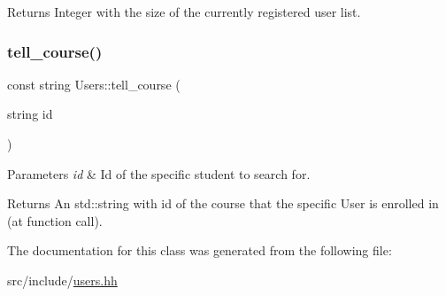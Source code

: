 \begin{DoxyReturn}{Returns}
Integer with the size of the currently registered user list. 
\end{DoxyReturn}
\mbox{\label{classUsers_ae684c15122bfac0f515a9c87307e0bbc}} 
\subsubsection{\texorpdfstring{tell\+\_\+course()}{tell\_course()}}
{\footnotesize\ttfamily const string Users\+::tell\+\_\+course (\begin{DoxyParamCaption}\item[{string}]{id }\end{DoxyParamCaption})}


\begin{DoxyParams}{Parameters}
{\em id} & Id of the specific student to search for. \\
\hline
\end{DoxyParams}
\begin{DoxyReturn}{Returns}
An std\+::string with id of the course that the specific User is enrolled in (at function call). 
\end{DoxyReturn}


The documentation for this class was generated from the following file\+:\begin{DoxyCompactItemize}
\item 
src/include/\hyperlink{users_8hh}{users.\+hh}\end{DoxyCompactItemize}
